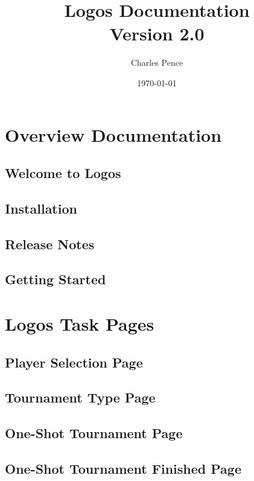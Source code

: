 \documentclass[openany]{book}
\title{Logos Documentation \\ {\large Version 2.0}}
\author{Charles Pence}
\date{\today}
\begin{document}
\maketitle

\tableofcontents

\part{Overview Documentation}

\chapter{Welcome to Logos}


\chapter{Installation}


\chapter{Release Notes}


\chapter{Getting Started}


\part{Logos Task Pages}

\chapter{Player Selection Page}


\chapter{Tournament Type Page}


\chapter{One-Shot Tournament Page}


\chapter{One-Shot Tournament Finished Page}

\end{document}
